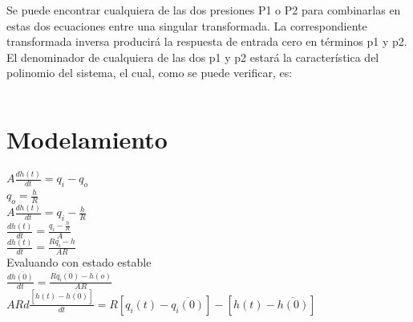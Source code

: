 \documentclass[a4paper,12pt,twoside]{proyectotanquesecci}
\begin{document}
\begin{equation}
\end{equation}

Se puede encontrar cualquiera de las dos presiones P1 o P2 para combinarlas en estas dos ecuaciones entre una singular transformada. La correspondiente transformada inversa producirá la respuesta de entrada cero en términos p1 y p2. El denominador de cualquiera de las dos p1 y p2 estará la característica del polinomio del sistema, el cual, como se puede verificar, es:

\begin{equation}
\end{equation}














\newpage





\section{Modelamiento}

$A\frac {dh\left( t\right) }{dt}=q_{i}-q_{o}$ \\
$q_{o}=\frac{h}{R}$ \\

$A\frac {dh\left( t\right) }{dt}=q_{i}-\frac {h}{R}$ \\
$\frac {dh\left( t\right) }{dt}=\frac {q_{i}-\frac {h}{R}}{A}$ \\
$\frac {dh\left( t\right) }{dt}=\frac {Rq_{i}-h}{AR}$ \\


Evaluando con estado estable \\
$\frac {d\overline {h\left( 0\right) }}{dt}=\frac {R\overline {q_{i}\left( 0\right) }-\overline {h\left( o\right) }}{AR}$ \\

$ARd\frac {\left[ h\left( t\right) -\overline {h\left( 0\right) }\right] }{dt}=R\left[ q_{i}\left( t\right) -\overline {q_{i}\left( 0\right) }\right] -\left[ h\left( t\right) -\overline {h\left( 0\right) }\right]$ \\
\end{document}
